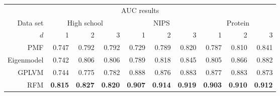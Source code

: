 
\begin{center}
  \begin{tabular}{r | r r r | r r r | r r r}
    \multicolumn{10}{c}{AUC results} \\
    \addlinespace[2pt]
    Data set & \multicolumn{3}{c|}{High school} & \multicolumn{3}{c|}{NIPS} & \multicolumn{3}{c}{Protein} \\
    $d$\footnotemark & 1 & 2 & 3 & 1 & 2 & 3 & 1 & 2 & 3 \\
    \midrule
    PMF                   & 0.747 & 0.792 & 0.792 & 0.729 & 0.789 & 0.820 & 0.787 & 0.810 & 0.841 \\
    Eigenmodel            & 0.742 & 0.806 & 0.806 & 0.789 & 0.818 & 0.845 & 0.805 & 0.866 & 0.882 \\
    GPLVM                 & 0.744 & 0.775 & 0.782 & 0.888 & 0.876 & 0.883 & 0.877 & 0.883 & 0.873 \\
    RFM & \textbf{0.815} & \textbf{0.827} & \textbf{0.820} & \textbf{0.907} & \textbf{0.914} & \textbf{0.919} & \textbf{0.903} & \textbf{0.910} & \textbf{0.912}
  \end{tabular}
\end{center}

